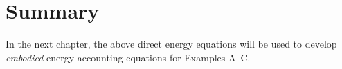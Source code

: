 \section{Summary}
\label{sec:energy_summary}

In the next chapter, the above direct energy equations will be used to 
develop \emph{embodied} energy accounting equations for Examples A--C.












%
%


